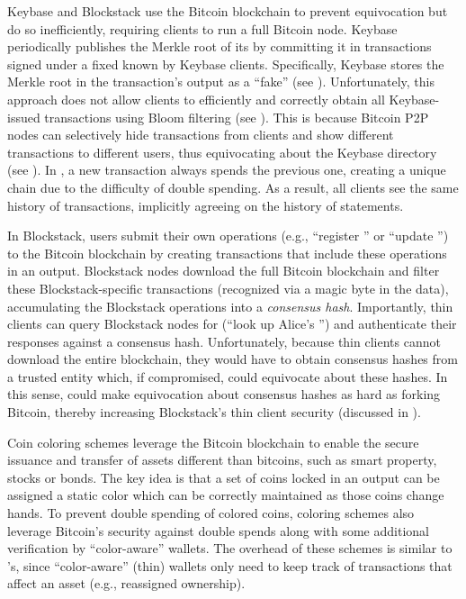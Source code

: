 Keybase\cite{keybase} and Blockstack\cite{blockstack,virtualchain} use the Bitcoin blockchain to prevent equivocation but do so inefficiently, requiring clients to run a full Bitcoin node.
Keybase periodically publishes the Merkle root of its \pkd by committing it in transactions signed under a fixed \pk known by Keybase clients\cite{keybase-txs}.
Specifically, Keybase stores the Merkle root in the transaction's output as a ``fake'' \pk (see ).
Unfortunately, this approach does not allow clients to efficiently and correctly obtain all Keybase-issued transactions using Bloom filtering (see ).
This is because Bitcoin P2P nodes can selectively hide transactions from clients and show different transactions to different users, thus equivocating about the Keybase directory (see ).
In \Sys, a new transaction always spends the previous one, creating a unique chain due to the difficulty of double spending.
As a result, all \Sys clients see the same history of transactions, implicitly agreeing on the history of statements.

In Blockstack\cite{blockstack}, users submit their own operations (e.g., ``register \pk'' or ``update \pk'') to the Bitcoin blockchain by creating transactions that include these operations in an \opret output.
Blockstack nodes download the full Bitcoin blockchain and filter these Blockstack-specific transactions (recognized via a magic byte in the \opret data), accumulating the Blockstack operations into a \emph{consensus hash}\cite{blockstack}.
Importantly, thin clients can query Blockstack nodes for \pks (\eg ``look up Alice's \pk'') and authenticate their responses against a consensus hash.
Unfortunately, because thin clients cannot download the entire blockchain, they would have to obtain consensus hashes from a trusted entity which, if compromised, could equivocate about these hashes.
In this sense, \Sys could make equivocation about consensus hashes as hard as forking Bitcoin, thereby increasing Blockstack's thin client security (discussed in ).

Coin coloring schemes \cite{colu,openassets,coinspark} leverage the Bitcoin blockchain to enable the secure issuance and transfer of assets different than bitcoins, such as smart property, stocks or bonds\cite{coloredcoinsoverview}.
The key idea is that a set of coins locked in an output can be assigned a static color which can be correctly maintained as those coins change hands.
To prevent double spending of colored coins, coloring schemes also leverage Bitcoin's security against double spends along with some additional verification by ``color-aware'' wallets.
The overhead of these schemes is similar to \Sys's, since ``color-aware'' (thin) wallets only need to keep track of transactions that affect an asset (e.g., reassigned ownership).

